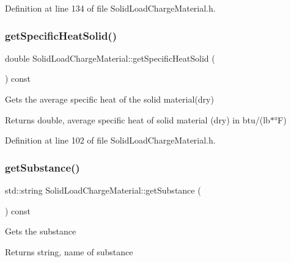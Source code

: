 Definition at line 134 of file Solid\+Load\+Charge\+Material.\+h.

\mbox{\label{class_solid_load_charge_material_af84f1f7dd167f67c0c02206339bbfe27}} 
\subsubsection{\texorpdfstring{get\+Specific\+Heat\+Solid()}{getSpecificHeatSolid()}}
{\footnotesize\ttfamily double Solid\+Load\+Charge\+Material\+::get\+Specific\+Heat\+Solid (\begin{DoxyParamCaption}{ }\end{DoxyParamCaption}) const\hspace{0.3cm}{\ttfamily [inline]}}

Gets the average specific heat of the solid material(dry) \begin{DoxyReturn}{Returns}
double, average specific heat of solid material (dry) in btu/(lb$\ast$°F) 
\end{DoxyReturn}


Definition at line 102 of file Solid\+Load\+Charge\+Material.\+h.

\mbox{\label{class_solid_load_charge_material_ade525be6bb8cb86405daeb61d45311f9}} 
\subsubsection{\texorpdfstring{get\+Substance()}{getSubstance()}}
{\footnotesize\ttfamily std\+::string Solid\+Load\+Charge\+Material\+::get\+Substance (\begin{DoxyParamCaption}{ }\end{DoxyParamCaption}) const\hspace{0.3cm}{\ttfamily [inline]}}

Gets the substance \begin{DoxyReturn}{Returns}
string, name of substance 
\end{DoxyReturn}



